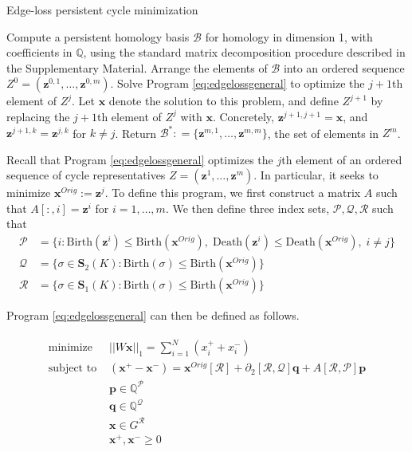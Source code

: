 \documentclass[11pt,onecolumn]{article}
\newcommand{\Q}{\mathbb{Q}}
\newcommand{\p}[0]{\mathbf{p}}
\newcommand{\q}[0]{\mathbf{q}}
\newcommand{\Simplices}[0]{\mathbf{S}}
\newcommand{\originalrep}{\mathbf{x}^{Orig}}
\newcommand{\optimalrep}{\mathbf{x}}
\newcommand{\cycle}{{\mathbf z}}
\newcommand{\birth}{\mathrm{Birth}}
\newcommand{\death}{\mathrm{Death}}
\newcommand{\hcyclebasis}{\mathcal B}
\newcommand{\goodcycleindices}{\mathcal P}
\newcommand{\goodtriangles}{\mathcal Q}
\newcommand{\goodedges}{\mathcal R}
\newcommand{\obasis}{Z} %
\newcommand{\obasisel}{\mathbf{z}}  %
\theoremstyle{plain}
\theoremstyle{definition}
\begin{document}
\begin{algorithm}
\caption{Edge-loss persistent cycle minimization}
\label{alg:edge}
\begin{algorithmic}[1]
\STATE Compute a persistent homology basis $\hcyclebasis$ for homology in dimension 1, with coefficients in $\Q$,  using the standard matrix decomposition procedure described in the Supplementary Material. Arrange the elements of $\hcyclebasis$ into an ordered sequence $\obasis^0 = (\obasisel^{0,1}, \ldots, \obasisel^{0,m})$.
\STATE Solve Program \eqref{eq:edgelossgeneral} to optimize the $j+1$th element of $\obasis^{j}$.  Let $\optimalrep$ denote the solution to this problem, and define $\obasis^{j+1}$ by replacing the $j+1$th element of $\obasis^{j}$ with $\optimalrep$.  Concretely, $\obasisel^{j+1,j+1} = \optimalrep$, and $\obasisel^{j+1,k} = \obasisel^{j,k}$ for $k \neq j$.
\ENDFOR
\STATE Return $\hcyclebasis^*: = \{\obasisel^{m,1}, \ldots, \obasisel^{m,m}\}$, the set of elements in $\obasis^m$.
\end{algorithmic}
\end{algorithm}


Recall that Program \eqref{eq:edgelossgeneral} optimizes the $j$th element of an ordered sequence of cycle representatives $\obasis = (\obasisel^1, \ldots, \obasisel^m)$.  In particular, it seeks to minimize $\originalrep := \cycle^j$.  To define this program, we first construct a matrix $A$ such that $A[:, i] = \cycle^i$ for $i = 1, \ldots, m$.  We then define  three index sets, $\goodcycleindices, \goodtriangles, \goodedges$ such that 
    \begin{align*}
        \goodcycleindices &= \{ i :  \birth(\cycle^i) \le \birth(\originalrep), \;  \death(\cycle^i) \le \death(\originalrep), \; i \neq j \} \\
        \goodtriangles &= \{\sigma \in \Simplices_2(K) : \birth(\sigma) \le \birth(\originalrep)\} 
        \\
        \goodedges &= \{\sigma \in \Simplices_1(K) : \birth(\sigma) \le \birth(\originalrep)\}
    \end{align*} 

Program \eqref{eq:edgelossgeneral} can then be defined as follows.

\begin{align}
\begin{split}
    \text{minimize   } & ||W \optimalrep ||_1 = \sum_{i=1}^N  (x^+_i + x_i^-)\\
   \text{subject to  } &  
      (\optimalrep^+ - \optimalrep^- )= \originalrep[\goodedges] +   \partial_2[\goodedges, \goodtriangles]  \q + A[\goodedges, \goodcycleindices] \p \\
      & \p \in \Q^{\goodcycleindices} \\
      & \q \in \Q^{\goodtriangles} \\      
      & \optimalrep \in G^{\goodedges } \\      
      & \optimalrep^+, \optimalrep^- \geq 0 
      \end{split}
      \tag{14}
      \label{eq:edgelossgeneral}
\end{align}
\end{document}
